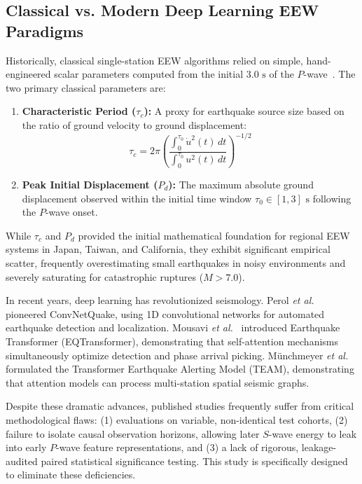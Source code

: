 \documentclass[journal]{IEEEtran}
\begin{document}
\subsection{Classical vs. Modern Deep Learning EEW Paradigms}
Historically, classical single-station EEW algorithms relied on simple, hand-engineered scalar parameters computed from the initial $3.0\text{ s}$ of the $P$-wave~\cite{allen2019earthquake, kanamori2005real}. The two primary classical parameters are:
\begin{enumerate}
    \item \textbf{Characteristic Period ($\tau_c$):} A proxy for earthquake source size based on the ratio of ground velocity to ground displacement:
    \begin{equation}
    \tau_c = 2\pi \left( \frac{\int_0^{\tau_0} \dot{u}^2(t) \, dt}{\int_0^{\tau_0} u^2(t) \, dt} \right)^{-1/2}
    \label{eq:tau_c}
    \end{equation}
    \item \textbf{Peak Initial Displacement ($P_d$):} The maximum absolute ground displacement observed within the initial time window $\tau_0 \in [1, 3]\text{ s}$ following the $P$-wave onset.
\end{enumerate}

While $\tau_c$ and $P_d$ provided the initial mathematical foundation for regional EEW systems in Japan, Taiwan, and California, they exhibit significant empirical scatter, frequently overestimating small earthquakes in noisy environments and severely saturating for catastrophic ruptures ($M > 7.0$).

In recent years, deep learning has revolutionized seismology. Perol \textit{et al.}~\cite{perol2018convolutional} pioneered ConvNetQuake, using 1D convolutional networks for automated earthquake detection and localization. Mousavi \textit{et al.}~\cite{mousavi2020earthquake} introduced Earthquake Transformer (EQTransformer), demonstrating that self-attention mechanisms simultaneously optimize detection and phase arrival picking. M{\"u}nchmeyer \textit{et al.}~\cite{munchmeyer2021transformer} formulated the Transformer Earthquake Alerting Model (TEAM), demonstrating that attention models can process multi-station spatial seismic graphs.

Despite these dramatic advances, published studies frequently suffer from critical methodological flaws: (1) evaluations on variable, non-identical test cohorts, (2) failure to isolate causal observation horizons, allowing later $S$-wave energy to leak into early $P$-wave feature representations, and (3) a lack of rigorous, leakage-audited paired statistical significance testing. This study is specifically designed to eliminate these deficiencies.
\end{document}
